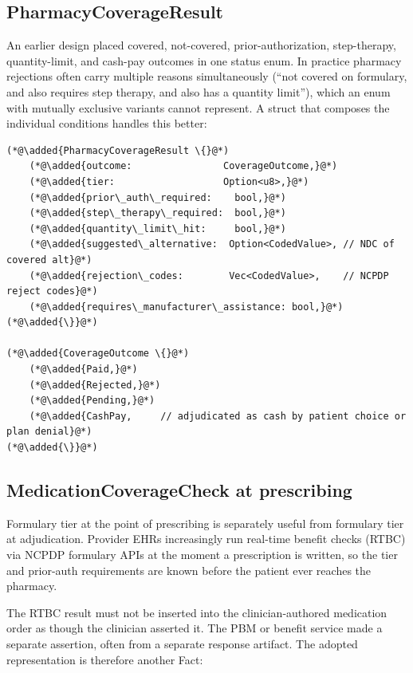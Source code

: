 \documentclass[11pt]{article}
\newcommand{\added}[1]{\textcolor{accentblue}{#1}}
\begin{document}
\subsection{PharmacyCoverageResult}
\label{sec:pharmacy-coverage-result}

An earlier design placed covered, not-covered, prior-authorization,
step-therapy, quantity-limit, and cash-pay outcomes in one status enum. In
practice
pharmacy rejections often carry multiple reasons simultaneously
(``not covered on formulary, and also requires step therapy, and also
has a quantity limit''), which an enum with mutually exclusive variants
cannot represent. A struct that composes the individual conditions
handles this better:

\begin{lstlisting}
(*@\added{PharmacyCoverageResult \{}@*)
    (*@\added{outcome:                CoverageOutcome,}@*)
    (*@\added{tier:                   Option<u8>,}@*)
    (*@\added{prior\_auth\_required:    bool,}@*)
    (*@\added{step\_therapy\_required:  bool,}@*)
    (*@\added{quantity\_limit\_hit:     bool,}@*)
    (*@\added{suggested\_alternative:  Option<CodedValue>, // NDC of covered alt}@*)
    (*@\added{rejection\_codes:        Vec<CodedValue>,    // NCPDP reject codes}@*)
    (*@\added{requires\_manufacturer\_assistance: bool,}@*)
(*@\added{\}}@*)

(*@\added{CoverageOutcome \{}@*)
    (*@\added{Paid,}@*)
    (*@\added{Rejected,}@*)
    (*@\added{Pending,}@*)
    (*@\added{CashPay,     // adjudicated as cash by patient choice or plan denial}@*)
(*@\added{\}}@*)
\end{lstlisting}

\subsection{MedicationCoverageCheck at prescribing}
\label{sec:formulary-tier}

Formulary tier at the point of prescribing is separately useful from
formulary tier at adjudication. Provider EHRs increasingly run
real-time benefit checks (RTBC) via NCPDP formulary APIs at the moment
a prescription is written, so the tier and prior-auth requirements
are known before the patient ever reaches the pharmacy.

The RTBC result must not be inserted into the clinician-authored medication
order as though the clinician asserted it. The PBM or benefit service made a
separate assertion, often from a separate response artifact. The adopted
representation is therefore another Fact:
\end{document}
